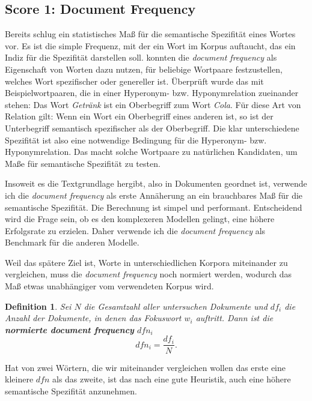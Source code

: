 \documentclass[11pt,numbers=noenddot]{scrartcl}
\newtheorem*{defi}{Definition}
\begin{document}
\subsection{Score 1: Document Frequency} \label{df}
Bereits \citet{sparckjones1972} schlug ein statistisches Maß für die semantische Spezifität eines Wortes vor. Es ist die simple Frequenz, mit der ein Wort im Korpus auftaucht, das ein Indiz für die Spezifität darstellen soll. \citet{Caraballo99determiningthe} konnten die \emph{document frequency} als Eigenschaft von Worten dazu nutzen, für beliebige Wortpaare festzustellen, welches Wort  spezifischer oder genereller ist. Überprüft wurde das mit Beispielwortpaaren, die in einer Hyperonym- bzw. Hyponymrelation zueinander stehen: Das Wort \emph{Getränk} ist ein Oberbegriff zum Wort \emph{Cola}. Für diese Art von Relation gilt: Wenn ein Wort ein Oberbegriff eines anderen ist, so ist der Unterbegriff semantisch spezifischer als der Oberbegriff. Die klar unterschiedene Spezifität ist also eine notwendige Bedingung für die Hyperonym- bzw. Hyponymrelation. Das macht solche Wortpaare zu natürlichen Kandidaten, um Maße für semantische Spezifität zu testen.

Insoweit es die Textgrundlage hergibt, also in Dokumenten geordnet ist, verwende ich die \emph{document frequency} als erste Annäherung an ein brauchbares Maß für die semantische Spezifität. Die Berechnung ist simpel und performant. Entscheidend wird die Frage sein, ob es den komplexeren Modellen gelingt, eine höhere Erfolgsrate zu erzielen. Daher verwende ich die \emph{document frequency} als Benchmark für die anderen Modelle.

Weil das spätere Ziel ist, Worte in unterschiedlichen Korpora miteinander zu vergleichen, muss die \emph{document frequency} noch normiert werden, wodurch das Maß etwas unabhängiger vom verwendeten Korpus wird.

\begin{defi}
Sei $N$ die Gesamtzahl aller untersuchen Dokumente und $df_i$ die Anzahl der Dokumente, in denen das Fokuswort $w_i$ auftritt. Dann ist die \textbf{normierte document frequency} $dfn_i$
\begin{equation}
    dfn_i = \frac{df_i}{N}.
\end{equation}
\end{defi}

Hat von zwei Wörtern, die wir miteinander vergleichen wollen das erste eine kleinere $dfn$ als das zweite, ist das nach \citet{Caraballo99determiningthe} eine gute Heuristik, auch eine höhere semantische Spezifität anzunehmen.
\end{document}
